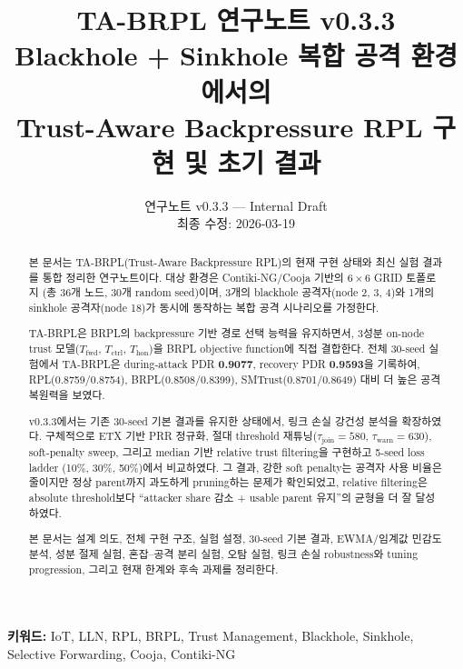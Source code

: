 \documentclass[12pt,a4paper]{article}
\begin{document}
\title{TA-BRPL 연구노트 v0.3.3\\
Blackhole + Sinkhole 복합 공격 환경에서의\\
Trust-Aware Backpressure RPL 구현 및 초기 결과}

\author{연구노트 v0.3.3 --- Internal Draft\\최종 수정: 2026-03-19}

\maketitle

\begin{abstract}
본 문서는 TA-BRPL(Trust-Aware Backpressure RPL)의 현재 구현 상태와 최신 실험 결과를
통합 정리한 연구노트이다. 대상 환경은 Contiki-NG/Cooja 기반의 $6\times6$ GRID 토폴로지
(총 36개 노드, 30개 random seed)이며, 3개의 blackhole 공격자(node 2, 3, 4)와
1개의 sinkhole 공격자(node 18)가 동시에 동작하는 복합 공격 시나리오를 가정한다.

TA-BRPL은 BRPL의 backpressure 기반 경로 선택 능력을 유지하면서,
3성분 on-node trust 모델($T_\text{fwd}$, $T_\text{ctrl}$, $T_\text{hon}$)을
BRPL objective function에 직접 결합한다. 전체 30-seed 실험에서 TA-BRPL은
during-attack PDR \textbf{0.9077}, recovery PDR \textbf{0.9593}을 기록하여,
RPL(0.8759/0.8754), BRPL(0.8508/0.8399), SMTrust(0.8701/0.8649) 대비
더 높은 공격 복원력을 보였다.

v0.3.3에서는 기존 30-seed 기본 결과를 유지한 상태에서, 링크 손실 강건성 분석을 확장하였다.
구체적으로 ETX 기반 PRR 정규화, 절대 threshold 재튜닝($\tau_\text{join}=580$, $\tau_\text{warn}=630$),
soft-penalty sweep, 그리고 median 기반 relative trust filtering을 구현하고 5-seed loss ladder
(10\%, 30\%, 50\%)에서 비교하였다. 그 결과, 강한 soft penalty는 공격자 사용 비율은 줄이지만
정상 parent까지 과도하게 pruning하는 문제가 확인되었고, relative filtering은 absolute threshold보다
``attacker share 감소 + usable parent 유지''의 균형을 더 잘 달성하였다.

본 문서는 설계 의도, 전체 구현 구조, 실험 설정, 30-seed 기본 결과,
EWMA/임계값 민감도 분석, 성분 절제 실험, 혼잡--공격 분리 실험,
오탐 실험, 링크 손실 robustness와 tuning progression, 그리고 현재 한계와 후속 과제를 정리한다.
\end{abstract}

\textbf{키워드:} IoT, LLN, RPL, BRPL, Trust Management, Blackhole, Sinkhole,
Selective Forwarding, Cooja, Contiki-NG
\end{document}
